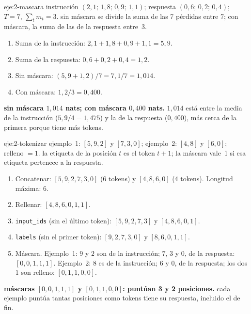 \begin{solucion}{eje:2-mascara}
\datos instrucción $(2{,}1;\,1{,}8;\,0{,}9;\,1{,}1)$; respuesta $(0{,}6;\,0{,}2;\,0{,}4)$; $T=7$, $\sum_t m_t=3$.
\planteamiento sin máscara se divide la suma de las 7 pérdidas entre 7; con máscara, la suma de las de la respuesta entre~3.
\pasos
\begin{enumerate}[label=\arabic*.]
  \item Suma de la instrucción: $2{,}1+1{,}8+0{,}9+1{,}1=5{,}9$.
  \item Suma de la respuesta: $0{,}6+0{,}2+0{,}4=1{,}2$.
  \item Sin máscara: $(5{,}9+1{,}2)/7=7{,}1/7=1{,}014$.
  \item Con máscara: $1{,}2/3=0{,}400$.
\end{enumerate}
\resultado \textbf{sin máscara $1{,}014$ nats; con máscara $0{,}400$ nats.}
\comprobacion $1{,}014$ está entre la media de la instrucción ($5{,}9/4=1{,}475$) y la de la respuesta ($0{,}400$), más cerca de la primera porque tiene más tokens.
\end{solucion}

\begin{solucion}{eje:2-tokenizar}
\datos ejemplo~1: $[5,9,2]$ y $[7,3,0]$; ejemplo~2: $[4,8]$ y $[6,0]$; relleno $=1$.
\planteamiento la etiqueta de la posición $t$ es el token $t+1$; la máscara vale~1 si esa etiqueta pertenece a la respuesta.
\pasos
\begin{enumerate}[label=\arabic*.]
  \item Concatenar: $[5,9,2,7,3,0]$ (6 tokens) y $[4,8,6,0]$ (4 tokens). Longitud máxima: 6.
  \item Rellenar: $[4,8,6,0,1,1]$.
  \item \texttt{input\_\allowbreak ids} (sin el último token): $[5,9,2,7,3]$ y $[4,8,6,0,1]$.
  \item \texttt{labels} (sin el primer token): $[9,2,7,3,0]$ y $[8,6,0,1,1]$.
  \item Máscara. Ejemplo~1: $9$ y $2$ son de la instrucción; $7$, $3$ y $0$, de la respuesta: $[0,0,1,1,1]$. Ejemplo~2: $8$ es de la instrucción; $6$ y $0$, de la respuesta; los dos $1$ son relleno: $[0,1,1,0,0]$.
\end{enumerate}
\resultado \textbf{máscaras $[0,0,1,1,1]$ y $[0,1,1,0,0]$: puntúan 3 y 2 posiciones.}
\comprobacion cada ejemplo puntúa tantas posiciones como tokens tiene su respuesta, incluido el de fin.
\end{solucion}

